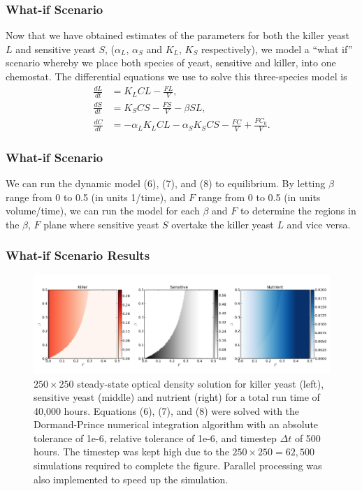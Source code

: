 \documentclass{beamer}
\begin{document}
\begin{frame}
  \frametitle{What-if Scenario}
  Now that we have obtained estimates of the parameters for both the killer yeast $L$ and sensitive yeast $S$, ($\alpha_L$, $\alpha_S$ and $K_L$, $K_S$ respectively), we model a ``what if'' scenario whereby we place both species of yeast, sensitive and killer, into one chemostat.  The differential equations we use to solve this three-species model is
  \begin{align}
    \frac{dL}{dt} &= K_L CL - \frac{FL}{V}, \\
    \frac{dS}{dt} &= K_S CS - \frac{FS}{V} - \beta S L, \\
    \frac{dC}{dt} &= -\alpha_L K_L CL -\alpha_S K_S CS - \frac{FC}{V} + \frac{FC_0}{V}.
  \end{align}
\end{frame}

\begin{frame}
  \frametitle{What-if Scenario}
  We can run the dynamic model (6), (7), and (8) to equilibrium.  By letting $\beta$ range from 0 to 0.5 (in units 1/time), and $F$ range from 0 to 0.5 (in units volume/time), we can run the model for each $\beta$ and $F$ to determine the regions in the $\beta$, $F$ plane where sensitive yeast $S$ overtake the killer yeast $L$ and vice versa.
\end{frame}

\begin{frame}
  \frametitle{What-if Scenario Results}
  \begin{figure}[H]
    \centering
      \includegraphics[width=1.0\textwidth]{../doc/images/sols.png}
    \caption{\footnotesize $250 \times 250$ steady-state optical density solution for killer yeast (left), sensitive yeast (middle) and nutrient (right) for a total run time of 40,000 hours.  Equations (6), (7), and (8) were solved with the Dormand-Prince numerical integration algorithm with an absolute tolerance of 1e-6, relative tolerance of 1e-6, and timestep $\Delta t$ of 500 hours.  The timestep was kept high due to the $250 \times 250 = 62,500$ simulations required to complete the figure. Parallel processing was also implemented to speed up the simulation.}
  \end{figure}  
\end{frame}
\end{document}
